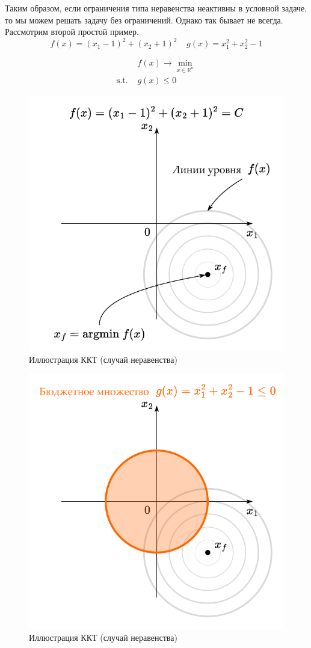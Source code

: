 \documentclass[
  russian,
  letterpaper,
  DIV=11,
  numbers=noendperiod]{scrartcl}
\begin{document}
Таким образом, если ограничения типа неравенства неактивны в условной
задаче, то мы можем решать задачу без ограничений. Однако так бывает не
всегда. Рассмотрим второй простой пример. \[
f(x) = (x_1 - 1)^2 + (x_2 + 1)^2 \;\;\;\; g(x) = x_1^2 + x_2^2 - 1
\]

\[
\begin{split}
& f(x) \to \min\limits_{x \in \mathbb{R}^n} \\
\text{s.t. } & g(x) \leq 0
\end{split}
\]

\begin{figure}[H]

{\centering \includegraphics[width=0.5\linewidth,height=\textheight,keepaspectratio]{ineq_constr_5_ru.pdf}

}

\caption{Иллюстрация ККТ (случай неравенства)}

\end{figure}%

\begin{figure}[H]

{\centering \includegraphics[width=0.5\linewidth,height=\textheight,keepaspectratio]{ineq_constr_6_ru.pdf}

}

\caption{Иллюстрация ККТ (случай неравенства)}

\end{figure}%
\end{document}
